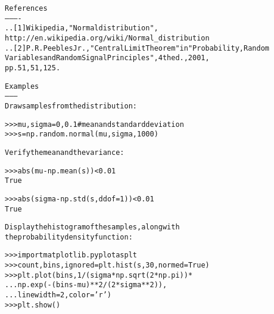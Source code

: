 \begin{boxedminipage}{\funcwidth}
\begin{alltt}
References
----------
.. [1] Wikipedia, "Normal distribution",
       http://en.wikipedia.org/wiki/Normal\_distribution
.. [2] P. R. Peebles Jr., "Central Limit Theorem" in "Probability, Random
       Variables and Random Signal Principles", 4th ed., 2001,
       pp. 51, 51, 125.

Examples
--------
Draw samples from the distribution:

{\textgreater}{\textgreater}{\textgreater} mu, sigma = 0, 0.1 \# mean and standard deviation
{\textgreater}{\textgreater}{\textgreater} s = np.random.normal(mu, sigma, 1000)

Verify the mean and the variance:

{\textgreater}{\textgreater}{\textgreater} abs(mu - np.mean(s)) {\textless} 0.01
True

{\textgreater}{\textgreater}{\textgreater} abs(sigma - np.std(s, ddof=1)) {\textless} 0.01
True

Display the histogram of the samples, along with
the probability density function:

{\textgreater}{\textgreater}{\textgreater} import matplotlib.pyplot as plt
{\textgreater}{\textgreater}{\textgreater} count, bins, ignored = plt.hist(s, 30, normed=True)
{\textgreater}{\textgreater}{\textgreater} plt.plot(bins, 1/(sigma * np.sqrt(2 * np.pi)) *
...                np.exp( - (bins - mu)**2 / (2 * sigma**2) ),
...          linewidth=2, color='r')
{\textgreater}{\textgreater}{\textgreater} plt.show()
\end{alltt}

\setlength{\parskip}{1ex}
    \end{boxedminipage}

    \label{trunk:qstkutil:bollinger:pareto}

    \vspace{0.5ex}

